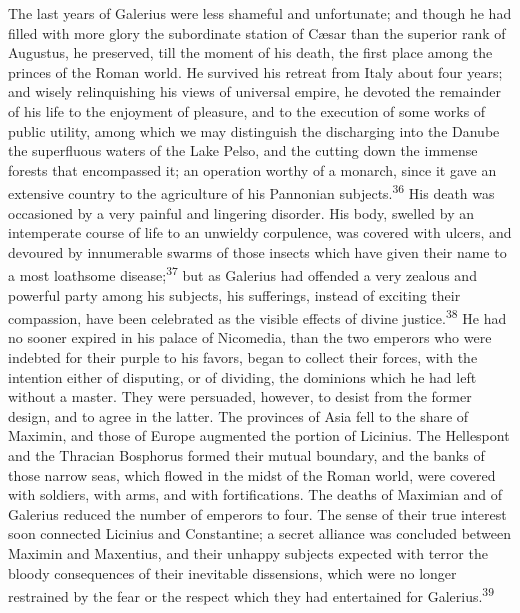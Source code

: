 The last years of Galerius were less shameful and unfortunate;
and though he had filled with more glory the subordinate station
of Cæsar than the superior rank of Augustus, he preserved, till
the moment of his death, the first place among the princes of the
Roman world. He survived his retreat from Italy about four years;
and wisely relinquishing his views of universal empire, he
devoted the remainder of his life to the enjoyment of pleasure,
and to the execution of some works of public utility, among which
we may distinguish the discharging into the Danube the
superfluous waters of the Lake Pelso, and the cutting down the
immense forests that encompassed it; an operation worthy of a
monarch, since it gave an extensive country to the agriculture of
his Pannonian subjects.\textsuperscript{36} His death was occasioned by a very
painful and lingering disorder. His body, swelled by an
intemperate course of life to an unwieldy corpulence, was covered
with ulcers, and devoured by innumerable swarms of those insects
which have given their name to a most loathsome disease;\textsuperscript{37} but
as Galerius had offended a very zealous and powerful party among
his subjects, his sufferings, instead of exciting their
compassion, have been celebrated as the visible effects of divine
justice.\textsuperscript{38} He had no sooner expired in his palace of Nicomedia,
than the two emperors who were indebted for their purple to his
favors, began to collect their forces, with the intention either
of disputing, or of dividing, the dominions which he had left
without a master. They were persuaded, however, to desist from
the former design, and to agree in the latter. The provinces of
Asia fell to the share of Maximin, and those of Europe augmented
the portion of Licinius. The Hellespont and the Thracian
Bosphorus formed their mutual boundary, and the banks of those
narrow seas, which flowed in the midst of the Roman world, were
covered with soldiers, with arms, and with fortifications. The
deaths of Maximian and of Galerius reduced the number of emperors
to four. The sense of their true interest soon connected Licinius
and Constantine; a secret alliance was concluded between Maximin
and Maxentius, and their unhappy subjects expected with terror
the bloody consequences of their inevitable dissensions, which
were no longer restrained by the fear or the respect which they
had entertained for Galerius.\textsuperscript{39}


